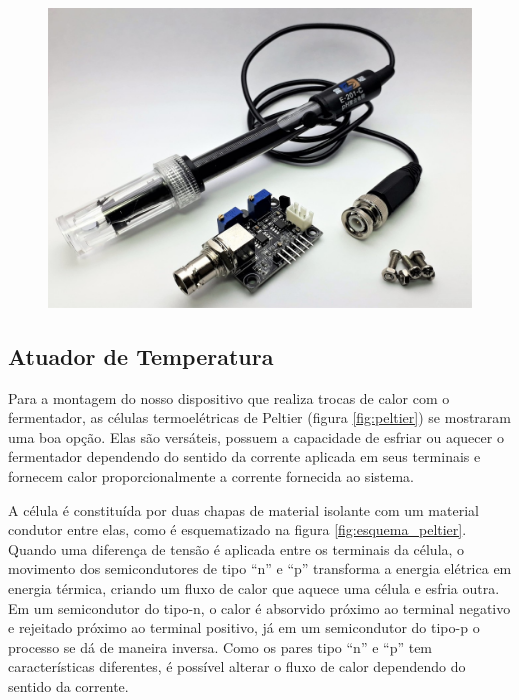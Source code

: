 \begin{figure}[h]
    \centering
    \includegraphics[scale=0.15]{figuras/projeto/hardware/E-201-C.jpg}
    \label{fig:E-201-C}
\end{figure}


\subsection{Atuador de Temperatura}

Para a montagem do nosso dispositivo que realiza trocas de calor com o fermentador, as células termoelétricas de Peltier (figura \ref{fig:peltier}) se mostraram uma boa opção. Elas são versáteis, possuem a capacidade de esfriar ou aquecer o fermentador dependendo do sentido da corrente aplicada em seus terminais e fornecem calor proporcionalmente a corrente fornecida ao sistema.


A célula é constituída por duas chapas de material isolante com um material condutor entre elas, como é esquematizado na figura \ref{fig:esquema_peltier}. Quando uma diferença de tensão é aplicada entre os terminais da célula, o movimento dos semicondutores de tipo “n” e “p” transforma a energia elétrica em energia térmica, criando um fluxo de calor que aquece uma célula e esfria outra. Em um semicondutor do tipo-n, o calor é absorvido próximo ao terminal negativo e rejeitado próximo ao terminal positivo, já em um semicondutor do tipo-p o processo se dá de maneira inversa. Como os pares tipo “n” e “p” tem características diferentes, é possível alterar o fluxo de calor dependendo do sentido da corrente.



